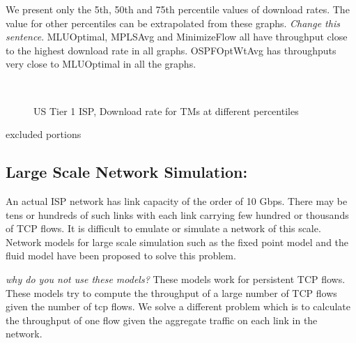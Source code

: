 We present only the 5th, 50th and 75th percentile values of download rates. The value for other percentiles can be extrapolated from these graphs. \emph{Change this sentence}. MLUOptimal, MPLSAvg and MinimizeFlow all have throughput close to the highest download rate in all graphs. OSPFOptWtAvg has throughputs very close to MLUOptimal in all the graphs. 

\begin{figure}[htp]
  \begin{center}
    \\
  \end{center}
  \caption{US Tier 1 ISP, Download rate for TMs at different percentiles }
  \label{fig:US_ISP_download_rate_percentile}
\end{figure}

excluded portions


\subsection{Large Scale Network Simulation:}
An actual ISP network has link capacity of the order of 10 Gbps. There may be tens or hundreds of such links with each link carrying few hundred or thousands of TCP flows. It is difficult to emulate or simulate a network of this scale. Network models for large scale simulation such as the fixed point model and the fluid model have been proposed to solve this problem.

\emph{why do you not use these models?} These models work for persistent TCP flows. These models try to compute the throughput of a large number of TCP flows given the number of tcp flows. We solve a different problem which is to calculate the throughput of one flow given the aggregate traffic on each link in the network. 


